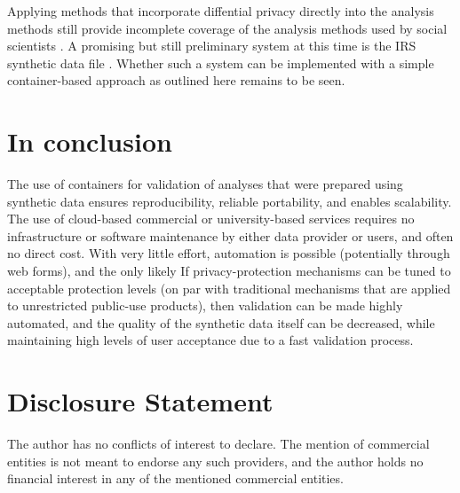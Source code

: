 \documentclass[inline]{hdsr}
\begin{document}
Applying methods that incorporate diffential privacy directly into the analysis methods \citep{alabi_hypothesis_2022,sheffet_differentially_2019,alabi_differentially_2023,chaudhuri_privacy-preserving_2008,alabi_differentially_2020} still provide incomplete coverage of the analysis methods used by social scientists \citep[see ][ for an overview]{barrientos_differentially_2021}. A promising but still preliminary system at this time is the IRS synthetic data file 
\citep{burman2018,tyagi_privacy-preserving_2024}. Whether such a system can be implemented with a simple container-based approach as outlined here remains to be seen. 

\section{In conclusion}

The use of containers for validation of analyses that were prepared using synthetic data ensures reproducibility, reliable portability, and enables scalability. The use of cloud-based commercial or university-based services requires no infrastructure or software maintenance by either data provider or users, and often no direct cost.  With very little effort, automation is possible (potentially through web forms), and the only likely  If   privacy-protection mechanisms can be tuned to acceptable protection levels (on par with traditional mechanisms that are applied to unrestricted public-use products), then validation can be made highly automated, and the quality of the synthetic data itself can be decreased, while maintaining high levels of user acceptance due to a fast validation process.






















\section*{Disclosure Statement}
The author has no conflicts of interest to declare. The mention of commercial entities is not meant to endorse any such providers, and the author holds no financial interest in any of the mentioned commercial entities.
\end{document}
